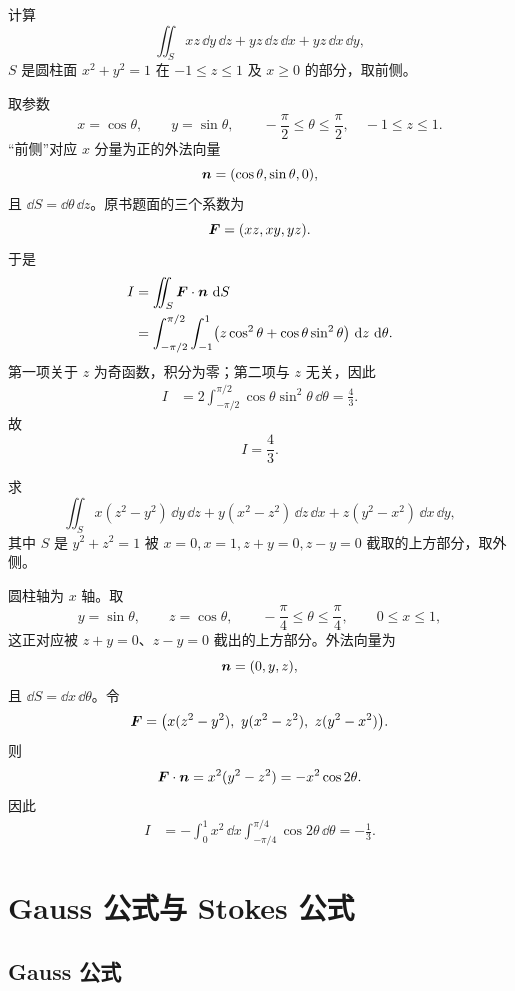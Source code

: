 \begin{xexercise}[6]
计算
\[
  \iint_S xz\,\dd y\,\dd z+yz\,\dd z\,\dd x+yz\,\dd x\,\dd y,
\]
$S$ 是圆柱面 $x^2+y^2=1$ 在 $-1\le z\le1$ 及 $x\ge0$ 的部分，取前侧。
\end{xexercise}
\begin{xsolution}
取参数
\[
  x=\cos\theta,\qquad y=\sin\theta,\qquad
  -\frac\pi2\le\theta\le\frac\pi2,\quad -1\le z\le1.
\]
“前侧”对应 $x$ 分量为正的外法向量
\[
  \bm{n}=(\cos\theta,\sin\theta,0),
\]
且 $\dd S=\dd\theta\,\dd z$。原书题面的三个系数为
\[
  \bm{F}=(xz,xy,yz).
\]
于是
\begin{align*}
I
&=\iint_S\bm{F}\cdot\bm{n}\,\mathop{}\!\mathrm{d} S\\
&=\int_{-\pi/2}^{\pi/2}\int_{-1}^{1}
  \bigl(z\cos^2\theta+\cos\theta\sin^2\theta\bigr)
  \,\mathop{}\!\mathrm{d} z\,\mathop{}\!\mathrm{d}\theta.
\end{align*}
第一项关于 $z$ 为奇函数，积分为零；第二项与 $z$ 无关，因此
\begin{align*}
I
&=2\int_{-\pi/2}^{\pi/2}\cos\theta\sin^2\theta\,\dd\theta
=\frac43.
\end{align*}
故
\[
  \boxed{I=\frac43}.
\]
\end{xsolution}


\begin{xexercise}[7]
求
\[
  \iint_S x(z^2-y^2)\,\dd y\,\dd z+y(x^2-z^2)\,\dd z\,\dd x+z(y^2-x^2)\,\dd x\,\dd y,
\]
其中 $S$ 是 $y^2+z^2=1$ 被 $x=0,x=1,z+y=0,z-y=0$ 截取的上方部分，取外侧。
\end{xexercise}
\begin{xsolution}
圆柱轴为 $x$ 轴。取
\[
  y=\sin\theta,\qquad z=\cos\theta,\qquad
  -\frac\pi4\le\theta\le\frac\pi4,\qquad0\le x\le1,
\]
这正对应被 $z+y=0$、$z-y=0$ 截出的上方部分。外法向量为
\[
  \bm{n}=(0,y,z),
\]
且 $\dd S=\dd x\,\dd\theta$。令
\[
\vect F=\bigl(x(z^2-y^2),\ y(x^2-z^2),\ z(y^2-x^2)\bigr).
\]
则
\[
  \bm{F}\cdot\bm{n}=x^2(y^2-z^2)=-x^2\cos2\theta.
\]
因此
\begin{align*}
I
&=-\int_0^1x^2\,\dd x\int_{-\pi/4}^{\pi/4}\cos2\theta\,\dd\theta
=-\frac13.
\end{align*}
\end{xsolution}


\section{Gauss 公式与 Stokes 公式}

\subsection{Gauss 公式}

